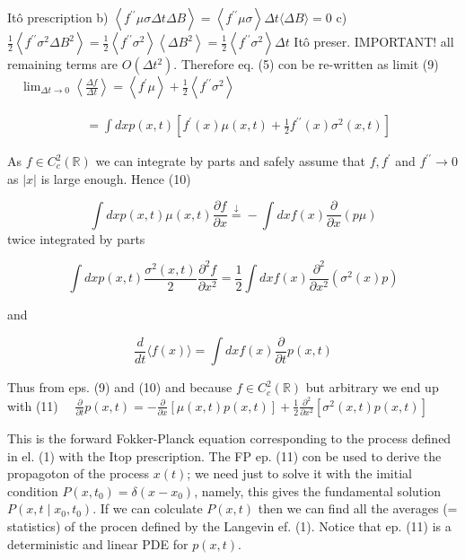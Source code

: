 Itô prescription
b) $\left\langle f^{\prime \prime} \mu \sigma \Delta t \Delta B\right\rangle=\left\langle f^{\prime \prime} \mu \sigma\right\rangle \Delta t\langle\Delta B\rangle=0$
c) $\frac{1}{2}\left\langle f^{\prime \prime} \sigma^{2} \Delta B^{2}\right\rangle=\frac{1}{2}\left\langle f^{\prime \prime} \sigma^{2}\right\rangle\left\langle\Delta B^{2}\right\rangle=\frac{1}{2}\left\langle f^{\prime \prime} \sigma^{2}\right\rangle \Delta t$ Itô preser. IMPORTANT!
all remaining terms are $O\left(\Delta t^{2}\right)$.
Therefore eq. (5) con be re-written as limit
(9) $\quad \lim _{\Delta t \rightarrow 0}\left\langle\frac{\Delta f}{\Delta t}\right\rangle=\left\langle f^{\prime} \mu\right\rangle+\frac{1}{2}\left\langle f^{\prime \prime} \sigma^{2}\right\rangle$

$$ \begin{aligned}
& =\int d x p(x, t)\left[f^{\prime}(x) \mu(x, t)+\frac{1}{2} f^{\prime \prime}(x) \sigma^{2}(x, t)\right]
\end{aligned}
$$ 

As $f \in C_{c}^{2}(\mathbb{R})$ we can integrate by parts and safely assume that $f, f^{\prime}$ and $f^{\prime \prime} \rightarrow 0$ as $|x|$ is large enough. Hence
(10)

$$ \int d x p(x, t) \mu(x, t) \frac{\partial f}{\partial x} \stackrel{\downarrow}{=}-\int d x f(x) \frac{\partial}{\partial x}(p \mu)
$$ 
twice integrated by parts

$$ \int d x p(x, t) \frac{\sigma^{2}(x, t)}{2} \frac{\partial^{2} f}{\partial x^{2}}=\frac{1}{2} \int d x f(x) \frac{\partial^{2}}{\partial x^{2}}\left(\sigma^{2}(x) p\right) $$

and

$$ \frac{d}{d t}\langle f(x)\rangle=\int d x f(x) \frac{\partial}{\partial t} p(x, t) $$

Thus from eps. (9) and (10) and because $f \in C_{c}^{2}(\mathbb{R})$ but arbitrary we end up with
(11) $\quad \frac{\partial}{\partial t} p(x, t)=-\frac{\partial}{\partial x}[\mu(x, t) p(x, t)]+\frac{1}{2} \frac{\partial^{2}}{\partial x^{2}}\left[\sigma^{2}(x, t) p(x, t)\right]$

This is the forward Fokker-Planck equation corresponding to the process defined in el. (1) with the Itop prescription. The FP ep. (11) con be used to derive the propagoton of the process $x(t)$; we need just to solve it with the imitial condition $P\left(x, t_{0}\right)=\delta\left(x-x_{0}\right)$, namely, this gives the fundamental solution $P\left(x, t \mid x_{0}, t_{0}\right)$. If we can colculate $P(x, t)$ then we can find all the averages (= statistics) of the procen defined by the Langevin ef. (1). Notice that ep. (11) is a deterministic and linear PDE for $p(x, t)$.

